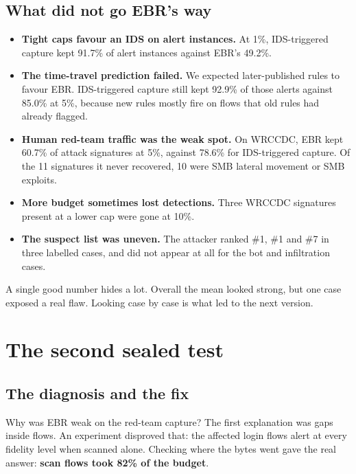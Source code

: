 \section{What did not go EBR's way}
\begin{itemize}
\item \textbf{Tight caps favour an IDS on alert instances.} At 1\%, IDS-triggered capture kept 91.7\% of alert instances against EBR's 49.2\%.
\item \textbf{The time-travel prediction failed.} We expected later-published rules to favour EBR. IDS-triggered capture still kept 92.9\% of those alerts against 85.0\% at 5\%, because new rules mostly fire on flows that old rules had already flagged.
\item \textbf{Human red-team traffic was the weak spot.} On WRCCDC, EBR kept 60.7\% of attack signatures at 5\%, against 78.6\% for IDS-triggered capture. Of the 11 signatures it never recovered, 10 were SMB lateral movement or SMB exploits.
\item \textbf{More budget sometimes lost detections.} Three WRCCDC signatures present at a lower cap were gone at 10\%.
\item \textbf{The suspect list was uneven.} The attacker ranked \#1, \#1 and \#7 in three labelled cases, and did not appear at all for the bot and infiltration cases.
\end{itemize}

\begin{bigidea}
A single good number hides a lot. Overall the mean looked strong, but one case exposed a real flaw. Looking case by case is what led to the next version.
\end{bigidea}

\chapter{The second sealed test}
\label{ch:second}

\section{The diagnosis and the fix}
Why was EBR weak on the red-team capture? The first explanation was gaps inside flows. An experiment disproved that: the affected login flows alert at every fidelity level when scanned alone. Checking where the bytes went gave the real answer: \textbf{scan flows took 82\% of the budget}.

